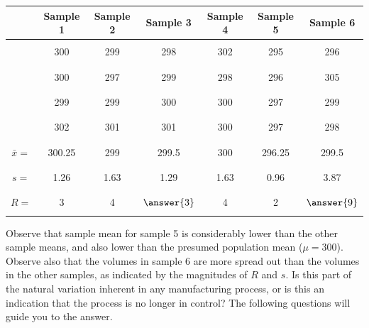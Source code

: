 \documentclass{ximera}
\begin{document}
\begin{center}
\begin{tabular}{|c|c|c|c|c|c|c|}
& Sample 1 & Sample 2 & Sample 3 & Sample 4 & Sample 5 & Sample 6  \\
 \hline
 \hline
   & & & & & &\\
 &300 & 299 & 298 & 302 & 295 &296 \\
  & & & & & &\\
  & & & & & &\\
 &300 & 297 & 299 & 298 & 296 & 305\\
  & & & & & &\\
 & & & & & &\\
 &299 & 299 & 300 & 300 & 297 & 299 \\
  & & & & & &\\
  & & & & & &\\
 &302 & 301  & 301 & 300 &297 & 298 \\
  & & & & & &\\
 \hline
 \hline
  & & & & & &\\
 $\bar{x}=$ & 300.25 & 299  & 299.5 & 300 & 296.25 & 299.5 \\
  & & & & & &\\
  \hline
  & & & & & &\\
 $s=$ & 1.26 & 1.63  & 1.29 & 1.63 & 0.96 & 3.87 \\
  & & & & & &\\
 \hline
   & & & & & &\\
 $R=$ & 3 & 4  & $\answer{3}$ & 4 & 2 & $\answer{9}$ \\
  & & & & & &\\
 \hline
\end{tabular}
\end{center}

Observe that sample mean for sample 5 is considerably lower than the other sample means, and also lower than the presumed population mean ($\mu=300$).  Observe also that the volumes in sample 6 are more spread out than the volumes in the other samples, as indicated by the magnitudes of $R$ and $s$.  Is this part of the natural variation inherent in any manufacturing process, or is this an indication that the process is no longer in control?  The following questions will guide you to the answer.
\end{document}
